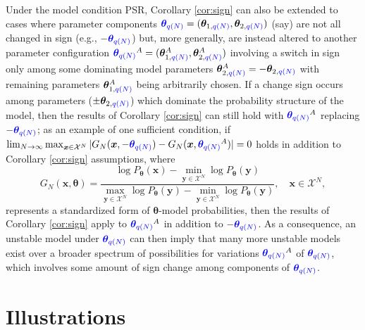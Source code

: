 \documentclass[numbib]{imamat}
\theoremstyle{theorem}
\theoremstyle{lemma}
\theoremstyle{example}
\theoremstyle{corollary}
\theoremstyle{definition}
\theoremstyle{remark}
\theoremstyle{approximation}
\theoremstyle{scheme}
\newcommand{\thetaidx}{q(N)}
\newcommand{\thetaN}{\boldsymbol \theta_{\thetaidx}}
\newcommand{\ak}[1]{{\color{blue} #1}}
\let\BeginKnitrBlock\begin \let\EndKnitrBlock\end
\begin{document}
\BeginKnitrBlock{remark}
\iffalse{} {Remark. } \fi{}Under the model condition PSR, Corollary \ref{cor:sign} can also be extended to
cases where parameter components \(\ak{\thetaN} =(\boldsymbol \theta_{1,\ak{\thetaidx}}, \boldsymbol \theta_{2, \ak{\thetaidx}})\) (say) are not all changed in sign (e.g., \(-\ak{\thetaN}\)) but, more generally, are instead altered to another parameter configuration \(\ak{\thetaN}^A = ( \boldsymbol \theta_{1,\ak{\thetaidx}}^A, \boldsymbol \theta_{2,\ak{\thetaidx}}^A )\) involving a switch in sign only among some dominating model parameters \(\boldsymbol \theta_{2,\ak{\thetaidx}}^A=- \boldsymbol \theta_{2,\ak{\thetaidx}}\) with remaining parameters \(\boldsymbol \theta_{1,\ak{\thetaidx}}^A\) being arbitrarily chosen. If a change sign occurs among parameters (\(\pm \boldsymbol \theta_{2,\ak{\thetaidx}}\)) which dominate the probability structure of the model, then the results of Corollary \ref{cor:sign} can still hold with \(\ak{\thetaN}^A\) replacing \(-\ak{\thetaN}\); as an example of one sufficient condition, if \(\lim_{N\to \infty} \max_{\boldsymbol x \in \mathcal{X}^N} |G_N(\boldsymbol x, -\ak{\thetaN}) - G_N(\boldsymbol x, \ak{\thetaN}^A)|=0\) holds in addition to Corollary \ref{cor:sign} assumptions, where
\[
G_N(\boldsymbol x, \boldsymbol \theta) =   \frac{\log P_{\boldsymbol \theta}(\boldsymbol x) - \min_{\boldsymbol y \in\mathcal{X}^N}\log P_{\boldsymbol \theta}(\boldsymbol y) }{\max_{\boldsymbol y \in\mathcal{X}^N}\log P_{\boldsymbol \theta}(\boldsymbol y)  - \min_{\boldsymbol y \in\mathcal{X}^N}\log P_{\boldsymbol \theta}(\boldsymbol y) }, \quad \boldsymbol x \in\mathcal{X}^N,
\]
represents a standardized form of \(\boldsymbol \theta\)-model probabilities, then the results of Corollary \ref{cor:sign} apply to \(\ak{\thetaN}^A\) in addition to \(-\ak{\thetaN}\). As a consequence, an unstable model under \(\ak{\thetaN}\) can then imply that many more unstable models exist over a broader spectrum of possibilities for variations \(\ak{\thetaN}^A\) of \(\ak{\thetaN}\), which involves some amount of sign change among components of \(\ak{\thetaN}\).
\EndKnitrBlock{remark}

\hypertarget{illustrations}{%
\section{Illustrations}\label{illustrations}}
\end{document}
